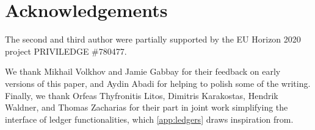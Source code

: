 \ifsubmit\else
\section{Acknowledgements}

The second and third author were partially supported by the EU Horizon 2020
project PRIVILEDGE \#780477.

We thank Mikhail Volkhov and Jamie Gabbay for their feedback on early versions
of this paper, and Aydin Abadi for helping to polish some of the writing.
\iffull Finally, we thank Orfeas Thyfronitis Litos, Dimitris Karakostas,
Hendrik Waldner, and Thomas Zacharias for their part in joint work simplifying
the interface of ledger functionalities, which \autoref{app:ledgers} draws
inspiration from.\fi


